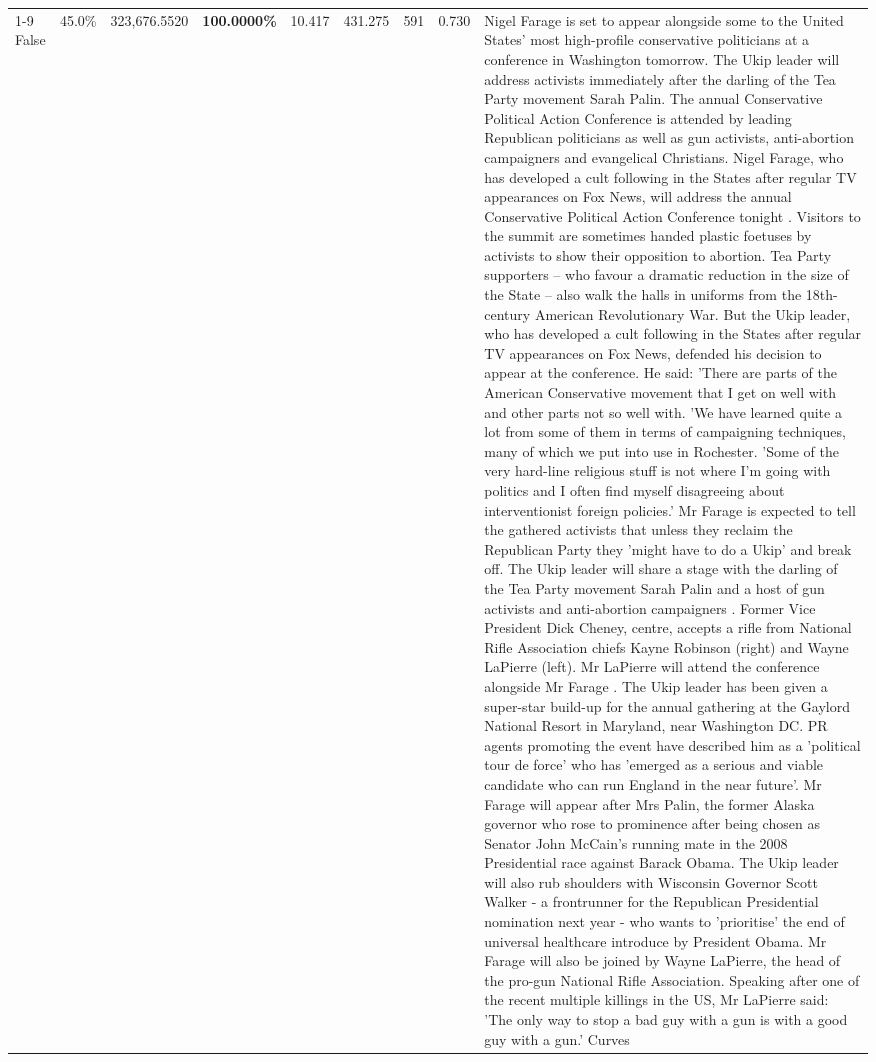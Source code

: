 \begin{table}[H]
\begin{tabular}{lllrlllll}
\cline{1-9}
False & 45.0\% & 323,676.5520 & \bfseries \color{red} 100.0000\% & 10.417 & 431.275 & 591 & 0.730 & Nigel Farage is set to appear alongside some to the United States' most high-profile conservative politicians at a conference in Washington tomorrow. The Ukip leader will address activists immediately after the darling of the Tea Party movement Sarah Palin. The annual Conservative Political Action Conference is attended by leading Republican politicians as well as gun activists, anti-abortion campaigners and evangelical Christians. Nigel Farage, who has developed a cult following in the States after regular TV appearances on Fox News, will address the annual Conservative Political Action Conference tonight . Visitors to the summit are sometimes handed plastic foetuses by activists to show their opposition to abortion. Tea Party supporters – who favour a dramatic reduction in the size of the State – also walk the halls in uniforms from the 18th-century American Revolutionary War. But the Ukip leader, who has developed a cult following in the States after regular TV appearances on Fox News, defended his decision to appear at the conference. He said: 'There are parts of the American Conservative movement that I get on well with and other parts not so well with. 'We have learned quite a lot from some of them in terms of campaigning techniques, many of which we put into use in Rochester. 'Some of the very hard-line religious stuff is not where I'm going with politics and I often find myself disagreeing about interventionist foreign policies.' Mr Farage is expected to tell the gathered activists that unless they reclaim the Republican Party they 'might have to do a Ukip' and break off. The Ukip leader will share a stage with the darling of the Tea Party movement Sarah Palin and a host of gun activists and anti-abortion campaigners . Former Vice President Dick Cheney, centre, accepts a rifle from National Rifle Association chiefs Kayne Robinson (right) and Wayne LaPierre (left). Mr LaPierre will attend the conference alongside Mr Farage . The Ukip leader has been given a super-star build-up for the annual gathering at the Gaylord National Resort in Maryland, near Washington DC. PR agents promoting the event have described him as a 'political tour de force' who has 'emerged as a serious and viable candidate who can run England in the near future'. Mr Farage will appear after Mrs Palin, the former Alaska governor who rose to prominence after being chosen as Senator John McCain's running mate in the 2008 Presidential race against Barack Obama. The Ukip leader will also rub shoulders with Wisconsin Governor Scott Walker - a frontrunner for the Republican Presidential nomination next year - who wants to 'prioritise' the end of universal healthcare introduce by President Obama. Mr Farage will also be joined by Wayne LaPierre, the head of the pro-gun National Rifle Association. Speaking after one of the recent multiple killings in the US, Mr LaPierre said: 'The only way to stop a bad guy with a gun is with a good guy with a gun.' Curves \\

\end{tabular}
\end{table}
